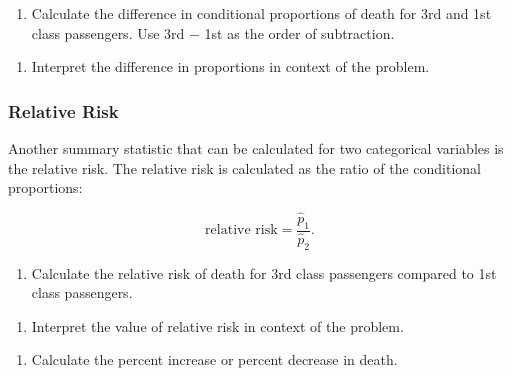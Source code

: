 \documentclass[
]{report}
\providecommand{\tightlist}{%
  \setlength{\itemsep}{0pt}\setlength{\parskip}{0pt}}
\begin{document}
\vspace{0.8in}

\begin{enumerate}
\def\labelenumi{\arabic{enumi}.}
\setcounter{enumi}{3}
\tightlist
\item
  Calculate the difference in conditional proportions of death for 3rd and 1st class passengers. Use 3rd \(-\) 1st as the order of subtraction.
\end{enumerate}

\vspace{0.8in}

\begin{enumerate}
\def\labelenumi{\arabic{enumi}.}
\setcounter{enumi}{4}
\tightlist
\item
  Interpret the difference in proportions in context of the problem.
\end{enumerate}

\vspace{0.8in}

\hypertarget{relative-risk-1}{%
\subsubsection*{Relative Risk}\label{relative-risk-1}}

Another summary statistic that can be calculated for two categorical variables is the relative risk. The relative risk is calculated as the ratio of the conditional proportions:

\[\text{relative risk} = \frac{\hat{p}_1}{\hat{p}_2}.\]

\begin{enumerate}
\def\labelenumi{\arabic{enumi}.}
\setcounter{enumi}{5}
\tightlist
\item
  Calculate the relative risk of death for 3rd class passengers compared to 1st class passengers.
\end{enumerate}

\vspace{0.8in}

\begin{enumerate}
\def\labelenumi{\arabic{enumi}.}
\setcounter{enumi}{6}
\tightlist
\item
  Interpret the value of relative risk in context of the problem.
\end{enumerate}

\vspace{0.8in}

\begin{enumerate}
\def\labelenumi{\arabic{enumi}.}
\setcounter{enumi}{7}
\tightlist
\item
  Calculate the percent increase or percent decrease in death.
\end{enumerate}
\end{document}

